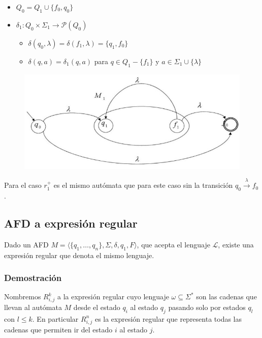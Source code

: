 \begin{itemize}
  \item \(Q_0 = Q_1 \cup \{f_0, q_0\}\)\
  \item \(\delta_1: Q_0 \times \Sigma_1 \rightarrow \mathcal{P}(Q_0)\)
        \begin{itemize}
          \item[] \(\delta(q_0, \lambda) = \delta(f_1,\lambda) = \{q_1, f_0\}\)
          \item[] \(\delta(q, a) = \delta_1(q, a)\) para \(q\in Q_1-\{f_1\}\) y \(a\in \Sigma_1\cup\{\lambda\}\)
        \end{itemize}
\end{itemize}
\begin{figure}[H]
  \begin{center}
    \includegraphics[scale=0.5]{imagenes/estrella}
  \end{center}
\end{figure}

Para el caso \(r_1^+\) es el mismo autómata que para este caso sin la transición \(q_0\overset{\lambda}{\rightarrow}f_0\).

\subsection{AFD a expresión regular}
\label{subsec:afd-er}
Dado un AFD \(M=\langle\{q_1, \dots, q_n\}, \Sigma, \delta, q_1, F\rangle\), que acepta el lenguaje \(\mathcal{L}\), existe una expresión regular que denota el mismo lenguaje.

\subsubsection{Demostración}
Nombremos \(R^k_{i,j}\) a la expresión regular cuyo lenguaje \(\omega \subseteq\Sigma^*\) son las cadenas que llevan al autómata \(M\) desde el estado \(q_i\) al estado \(q_j\) pasando solo por estados \(q_l\) con \(l\leq k\). En particular \(R^n_{i,j}\) es la expresión regular que representa todas las cadenas que permiten ir del estado \(i\) al estado \(j\).

